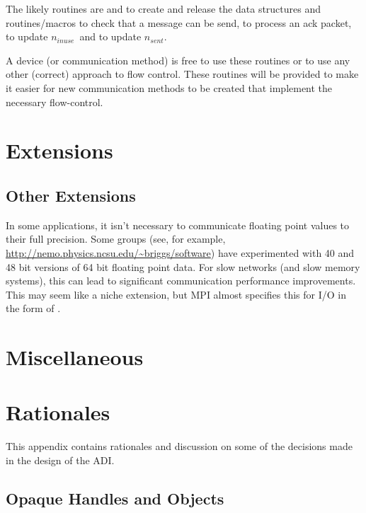 \documentclass{article}
\let\findex=\index
\begin{document}
The likely routines are
 and  to create and
release the data structures and routines/macros 
to check that a message can be send,  to process
an ack packet,  to update 
\makeussubscript$n_{inuse}$\makeustext\ and
 to update \makeussubscript$n_{sent}$\makeustext.

A device (or communication method) is free to use these routines or to
use any other (correct) approach to flow control.  These routines will
be provided to make it easier for new communication methods to be
created that implement the necessary flow-control.

\section{Extensions}


\subsection{Other Extensions}
In some applications, it isn't necessary to communicate floating point values
to their full precision.  Some groups (see, for example,
\url{http://nemo.physics.ncsu.edu/~briggs/software}) have experimented with 40
and 48 bit versions of 64 bit floating point data.  For slow networks (and
slow memory systems), this can lead to significant communication performance
improvements.  This may seem like a niche extension, but MPI almost specifies
this for I/O in the form of
\findex{MPI_Register_datarep}.   

\openin{}
\ifeof\testfile\else
\section{Miscellaneous}

\fi
\closein\testfile

\appendix
\section{Rationales}
\label{sec:rationales}
This appendix contains rationales and discussion on some of the
decisions made in the design of the ADI.

\subsection{Opaque Handles and Objects}
\end{document}
